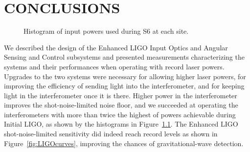 \chapter{CONCLUSIONS}

\begin{figure}
\begin{centering}
\caption[Histogram of input powers used during S6]{Histogram of input
  powers used during S6 at each site.}
\label{fig:S6pwrs}
\end{centering}
\end{figure}

We described the design of the Enhanced LIGO Input Optics and Angular
Sensing and Control subsystems and presented measurements
characterizing the systems and their performances when operating with
record laser powers. Upgrades to the two systems were necessary for
allowing higher laser powers, for improving the efficiency of sending
light into the interferometer, and for keeping light in the
interferometer once it is there. Higher power in the interferometer
improves the shot-noise-limited noise floor, and we succeeded at
operating the interferometers with more than twice the highest of
powers achievable during Initial LIGO, as shown by the histograms in
Figure~\ref{fig:S6pwrs}. The Enhanced LIGO shot-noise-limited
sensitivity did indeed reach record levels as shown in
Figure~\ref{fig:LIGOcurves}, improving the chances of gravitational-wave
detection.

